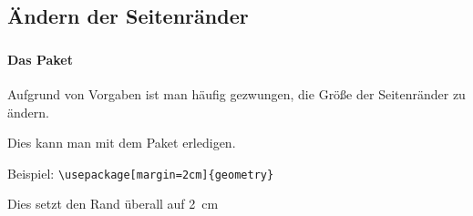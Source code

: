 \subsection{Ändern der Seitenränder}

\begin{frame}[fragile]
    \frametitle{\subsecname}
    \framesubtitle{Das Paket }
    
    Aufgrund von Vorgaben ist man häufig gezwungen, die Größe der Seitenränder zu ändern.
    
    \medskip\pause
    Dies kann man mit dem Paket  erledigen.
    
    \smallskip
    Beispiel: \verb+\usepackage[margin=2cm]{geometry}+
    \smallskip
    
    Dies setzt den Rand überall auf \SI{2}{cm}
\end{frame}